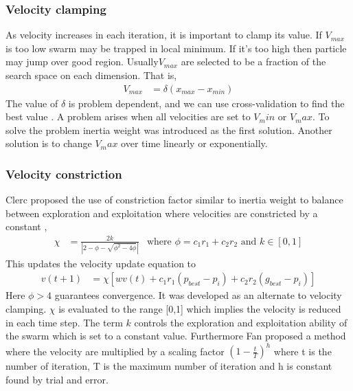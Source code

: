 \documentclass{article}
\begin{document}
\subsubsection{Velocity clamping}
As velocity increases in each iteration, it is important to clamp its value. If $V_{max}$ is too low swarm may be trapped in local minimum. If it's too high then particle may jump over good region. Usually$V_{max}$ are selected to be a fraction of the search space on each dimension. That is,
\begin{align*}
    V_{max} &=  \delta(x_{max} - x_{min})
\end{align*}
The value of $\delta$ is problem dependent, and we can use cross-validation to find the best value \cite{omran2004image}. A problem arises when all velocities are set to $V_min$ or $V_max$. To solve the problem inertia  weight was introduced as the first solution. Another solution is to change $V_max$ over time linearly or exponentially.

\subsubsection{Velocity constriction}
Clerc  proposed the use of constriction factor similar to inertia weight to balance between exploration and exploitation where velocities are constricted by a constant \cite{clerc1999swarm},
\begin{align*}
\chi &= \frac{2k}{|2-\phi - \sqrt{\phi^2 - 4\phi}|} & \text{where } \phi = c_1 r_1 + c_2 r_2 \text{ and } k \in [0,1]
\end{align*}
This updates the velocity update equation to 
\begin{align*}v(t+1) &= \chi[wv(t) + c_1r_1(p_{best} - p_i) + c_2r_2(g_{best} - p_i)]\end{align*}
Here $\phi > 4$  guarantees convergence. It was developed as an alternate to velocity clamping. $\chi$ is evaluated to the range [0,1] which implies the velocity is reduced in each time step. The term $k$ controls the exploration and exploitation ability of the swarm which is set to a constant value. Furthermore Fan proposed a method where the velocity are multiplied by a scaling factor $(1 - \frac{t}{T})^h$ where t is the number of iteration, T is the maximum number of iteration and h is constant found by trial and error.\cite{fan2002modification} 
\end{document}
